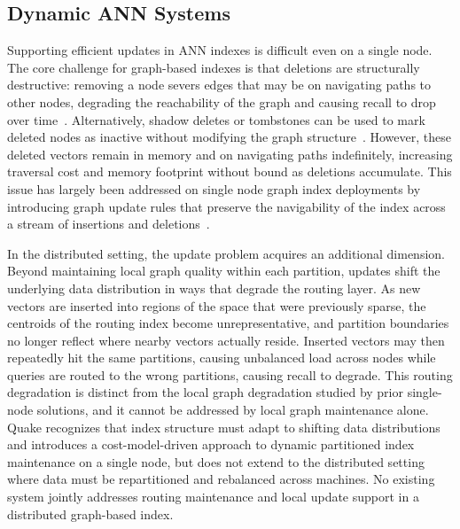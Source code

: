 \documentclass[sigconf,review,anonymous]{acmart}
\begin{document}
\subsection{Dynamic ANN Systems}
    Supporting efficient updates in ANN indexes is difficult even on a single node. The core challenge for graph-based indexes is that deletions are structurally destructive: removing a node severs edges that may be on navigating paths to other nodes, degrading the reachability of the graph and causing recall to drop over time~\cite{singh2021freshdiskann, yu2025topology, xiao2024enhancing, xu2025place}.
    Alternatively, shadow deletes or tombstones can be used to mark deleted nodes as inactive without modifying the graph structure~\cite{malkov2018efficient, singh2021freshdiskann}. However, these deleted vectors remain in memory and on navigating paths indefinitely, increasing traversal cost and memory footprint without bound as deletions accumulate.
    This issue has largely been addressed on single node graph index deployments by introducing graph update rules that preserve the navigability of the index across a stream of insertions and deletions~\cite{yu2025topology, xu2025place, xiao2024enhancing}.

    In the distributed setting, the update problem acquires an additional dimension. Beyond maintaining local graph quality within each partition, updates shift the underlying data distribution in ways that degrade the routing layer. As new vectors are inserted into regions of the space that were previously sparse, the centroids of the routing index become unrepresentative, and partition boundaries no longer reflect where nearby vectors actually reside. Inserted vectors may then repeatedly hit the same partitions, causing unbalanced load across nodes while queries are routed to the wrong partitions, causing recall to degrade. This routing degradation is distinct from the local graph degradation studied by prior single-node solutions, and it cannot be addressed by local graph maintenance alone. Quake \cite{mohoney2025quake} recognizes that index structure must adapt to shifting data distributions and introduces a cost-model-driven approach to dynamic partitioned index maintenance on a single node, but does not extend to the distributed setting where data must be repartitioned and rebalanced across machines. No existing system jointly addresses routing maintenance and local update support in a distributed graph-based index.
\end{document}
